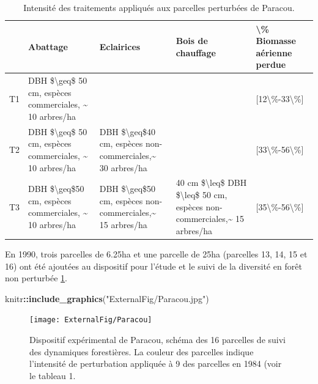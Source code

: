 \documentclass[
  11pt,
  french,
  A4paper,
  extrafontsizes,onecolumn,openright
  ]{memoir}
\newenvironment{Shaded}{\begin{snugshade}}{\end{snugshade}}
\newcommand{\KeywordTok}[1]{\textcolor[rgb]{0.13,0.29,0.53}{\textbf{#1}}}
\newcommand{\StringTok}[1]{\textcolor[rgb]{0.31,0.60,0.02}{#1}}
\newcommand{\OperatorTok}[1]{\textcolor[rgb]{0.81,0.36,0.00}{\textbf{#1}}}
\newcommand{\NormalTok}[1]{#1}
\begin{document}
\begin{table}

\caption{\label{tab:InterventionTable}Intensité des traitements appliqués aux parcelles perturbées de Paracou.}
\centering
\begin{tabular}[t]{lllll}
\toprule
  & Abattage & Eclairices & Bois de chauffage & \textbackslash{}\% Biomasse aérienne perdue\\
\midrule
T1 & DBH \$\textbackslash{}geq\$ 50 cm, espèces commerciales, \textasciitilde{} 10 arbres/ha &  &  & [12\textbackslash{}\%-33\textbackslash{}\%]\\
T2 & DBH \$\textbackslash{}geq\$ 50 cm, espèces commerciales, \textasciitilde{} 10 arbres/ha & DBH \$\textbackslash{}geq\$40 cm, espèces non-commerciales,\textasciitilde{} 30 arbres/ha &  & [33\textbackslash{}\%-56\textbackslash{}\%]\\
T3 & DBH \$\textbackslash{}geq\$50 cm, espèces commerciales, \textasciitilde{} 10 arbres/ha & DBH \$\textbackslash{}geq\$50 cm, espèces non-commerciales,\textasciitilde{} 15 arbres/ha & 40 cm \$\textbackslash{}leq\$ DBH \$\textbackslash{}leq\$ 50 cm, espèces non-commerciales,\textasciitilde{} 15 arbres/ha & [35\textbackslash{}\%-56\textbackslash{}\%]\\
\bottomrule
\end{tabular}
\end{table}

En 1990, trois parcelles de 6.25ha et une parcelle de 25ha (parcelles
13, 14, 15 et 16) ont été ajoutées au dispositif pour l'étude et le
suivi de la diversité en forêt non perturbée \ref{fig:ParacouDesign}.

\begin{Shaded}
\begin{Highlighting}[]
\NormalTok{knitr}\OperatorTok{::}\KeywordTok{include_graphics}\NormalTok{(}\StringTok{"ExternalFig/Paracou.jpg"}\NormalTok{)}
\end{Highlighting}
\end{Shaded}

\begin{figure}

{\centering \texttt{[image: ExternalFig/Paracou]} 

}

\caption{Dispositif expérimental de Paracou, schéma des 16 parcelles de suivi des dynamiques forestières. La couleur des parcelles indique l'intensité de perturbation appliquée à 9 des parcelles en 1984 (voir le tableau 1.}\label{fig:ParacouDesign}
\end{figure}
\end{document}
